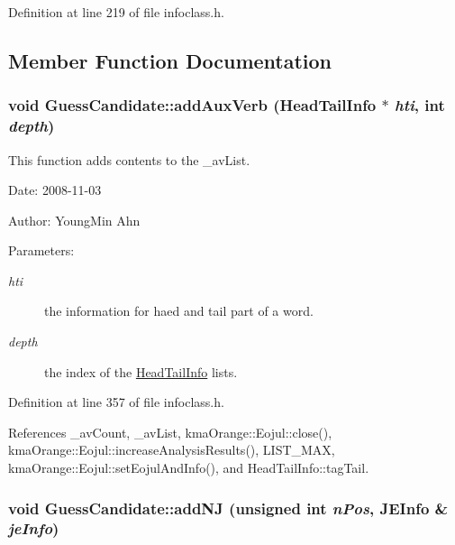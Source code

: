 Definition at line 219 of file infoclass.h.

\subsection{Member Function Documentation}
\hypertarget{classGuessCandidate_5da582496746546080413e951e3078f3}{
\subsubsection[{addAuxVerb}]{\setlength{\rightskip}{0pt plus 5cm}void GuessCandidate::addAuxVerb ({\bf HeadTailInfo} $\ast$ {\em hti}, \/  int {\em depth})}}
\label{classGuessCandidate_5da582496746546080413e951e3078f3}


This function adds contents to the \_\-avList. 

\begin{Desc}
\item[Date:]2008-11-03 \end{Desc}
\begin{Desc}
\item[Author:]YoungMin Ahn \end{Desc}
\begin{Desc}
\item[Parameters:]
\begin{description}
\item[{\em hti}]the information for haed and tail part of a word. \item[{\em depth}]the index of the \hyperlink{classHeadTailInfo}{HeadTailInfo} lists. \end{description}
\end{Desc}


Definition at line 357 of file infoclass.h.

References \_\-avCount, \_\-avList, kmaOrange::Eojul::close(), kmaOrange::Eojul::increaseAnalysisResults(), LIST\_\-MAX, kmaOrange::Eojul::setEojulAndInfo(), and HeadTailInfo::tagTail.\hypertarget{classGuessCandidate_82efa1e3539398ef8c2d0e59540bbcb8}{
\subsubsection[{addNJ}]{\setlength{\rightskip}{0pt plus 5cm}void GuessCandidate::addNJ (unsigned int {\em nPos}, \/  {\bf JEInfo} \& {\em jeInfo})}}
\label{classGuessCandidate_82efa1e3539398ef8c2d0e59540bbcb8}


